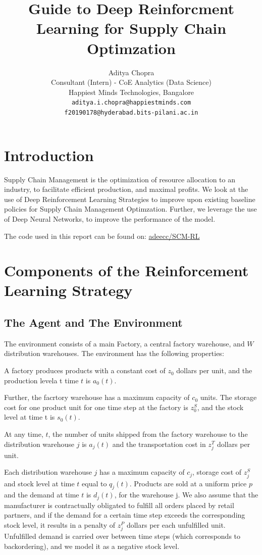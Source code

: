 \documentclass{article}
\title{Guide to Deep Reinforcment Learning for Supply Chain Optimzation}
\author{ {Aditya Chopra} \\
	Consultant (Intern) - CoE Analytics (Data Science) \\
	Happiest Minds Technologies, Bangalore \\
	\texttt{aditya.i.chopra@happiestminds.com} \\
	\texttt{f20190178@hyderabad.bits-pilani.ac.in}
}
\begin{document}
\maketitle

\section{Introduction}

Supply Chain Management is the optimization of resource allocation to an industry, to facilitate efficient production, and maximal profits. We look at the use of Deep Reinforcement Learning Strategies to improve upon existing baseline policies for Supply Chain Management Optimzation. Further, we leverage the use of Deep Neural Networks, to improve the performance of the model.

The code used in this report can be found on: \href{https://github.com/adeecc/SCM-RL}{adeecc/SCM-RL}





\section{Components of the Reinforcement Learning Strategy}

\subsection{The Agent and The Environment}
The environment consists of a main Factory, a central factory warehouse, and $W$ distribution warehouses. The environment has the following properties:

A factory produces products with a constant cost of $z_0$ dollars per unit, and the production levela t time $t$ is $a_0(t).$

Further, the facrtory warehouse has a maximum capacity of $c_0$ units. The storage cost for one product unit for one time step at the factory is $z_0^S$, and the stock level at time t is $s_0(t)$.

At any time, $t$, the number of units shipped from the factory warehouse to the distribution warehouse $j$ is $a_j(t)$ and the transportation cost in $z_j^T$ dollars per unit.

Each distribution warehouse $j$ has a maximum capacity of $c_j$, storage cost of $z_j^S$ and stock level at time $t$ equal to $q_j(t)$. Products are sold at a uniform price $p$ and the demand at time $t$ is $d_j(t)$, for the warehouse j. We also assume that the manufacturer is contractually obligated to fulfill all orders placed by retail partners, and if the demand for a certain time step exceeds the corresponding stock level, it results in a penalty of $z_j^P$ dollars per each unfulfilled unit. Unfulfilled demand is carried over between time steps (which corresponds to backordering), and we model it as a negative stock level.
\end{document}
